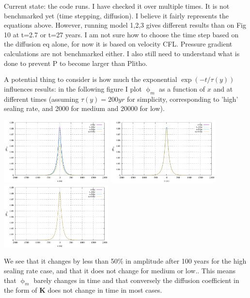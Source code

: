 {\color{red} Current state: the code runs. I have checked it over multiple times. 
It is not benchmarked yet (time stepping, diffusion). 
I believe it fairly represents the equations above. 
However, running model 1,2,3 gives different results than on Fig 10 at t=2.7 or
t=27 years. I am not sure how to choose the time step based on 
the diffusion eq alone, for now it is based on velocity CFL. 
Pressure gradient calculations are not benchmarked either. 
I also still need to understand what is done to prevent P to become 
larger than Plitho.
}

A potential thing to consider is how much the exponential $\exp(-t/\tau(y))$
influences results: in the following figure I plot $\upphi_m$ as a function of 
$x$ and at different times (assuming $\tau(y)=200yr$ for simplicity, corresponding
to 'high' sealing rate, and 2000 for medium and 20000 for low).

\begin{center}
\includegraphics[width=5.7cm]{python_codes/fieldstone_126/images/phi200}
\includegraphics[width=5.7cm]{python_codes/fieldstone_126/images/phi2000}
\includegraphics[width=5.7cm]{python_codes/fieldstone_126/images/phi20000}
\end{center}

We see that it changes by less than 50\% in amplitude after 100 years for the 
high sealing rate case, and that it does not change for medium or low..  
This means that $\upphi_m$ barely changes in time and that 
conversely the diffusion coefficient in the form of ${\bm K}$ does not
change in time in most cases. 




